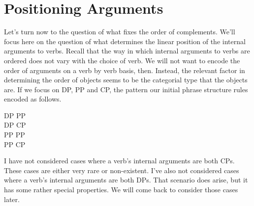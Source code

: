 \setcounter{chapter}{2}
\chapter{Positioning Arguments}
\label{ch:positargs}
\setcounter{exx}{0}

\noindent
Let's turn now to the question of what fixes the order of complements. We'll focus here on the question of what determines the linear position of the internal arguments to verbs. Recall that the way in which internal arguments to verbs are ordered does not vary with the choice of verb. We will not want to encode the order of arguments on a verb by verb basis, then. Instead, the relevant factor in determining the order of objects seems to be the categorial type that the objects are. If we focus on DP, PP and CP, the pattern our initial phrase structure rules encoded as follows.
\begin{exe}
	\ex \label{ex3:comptemplate} DP PP\\ DP CP\\ PP PP\\ PP CP
	\ex \label{ex3:examcomptempl} 
	\begin{xlist}
	\end{xlist}
\end{exe}
I have not considered cases where a verb's internal arguments are both CPs. These cases are either very rare or non-existent. I've also not considered cases where a verb's internal arguments are both DPs. That scenario does arise, but it has some rather special properties. We will come back to consider those cases later.

